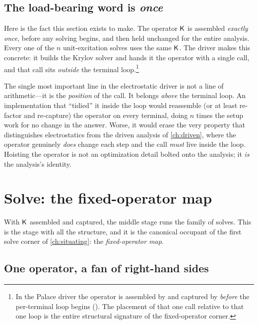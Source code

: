 \subsection{The load-bearing word is \emph{once}}

Here is the fact this section exists to make. The operator $\mathsf{K}$ is assembled
\emph{exactly once}, before any solving begins, and then held unchanged for the
entire analysis. Every one of the $n$ unit-excitation solves uses the same $\mathsf{K}$.
The driver makes this concrete: it builds the Krylov solver and hands it the
operator with a single  call, and that call sits \emph{outside}
the terminal loop.\footnote{In the Palace driver the operator is assembled by
 and captured by  \emph{before} the per-terminal  loop begins
(). The placement of that one
call relative to that one loop is the entire structural signature of the
fixed-operator corner.}

\begin{pitfall}
The single most important line in the electrostatic driver is not a line of
arithmetic---it is the \emph{position} of the  call. It belongs
\emph{above} the terminal loop. An implementation that ``tidied'' it inside the
loop would reassemble (or at least re-factor and re-capture) the operator on every
terminal, doing $n$ times the setup work for no change in the answer. Worse, it
would erase the very property that distinguishes electrostatics from the driven
analysis of \cref{ch:driven}, where the operator genuinely \emph{does} change each
step and the call \emph{must} live inside the loop. Hoisting the operator is not an
optimization detail bolted onto the analysis; it \emph{is} the analysis's identity.
\end{pitfall}

\section{Solve: the fixed-operator map}
\label{sec:es-solve}

With $\mathsf{K}$ assembled and captured, the middle stage runs the family of solves.
This is the stage with all the structure, and it is the canonical occupant of the
first solve corner of \cref{ch:situating}: the \emph{fixed-operator map}.

\subsection{One operator, a fan of right-hand sides}

